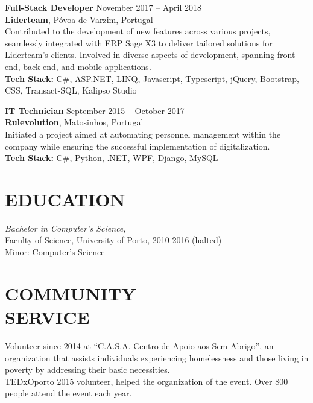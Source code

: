 \documentclass[margin, 10pt]{res} %
\newcommand{\jobheader}[4]{%
    \textbf{#1} \hfill #4\\
    \textbf{#2}, #3%
}
\newcommand{\jobentry}[6]{%
    \jobheader{#1}{#2}{#3}{#4}\\
    #5\\
    \textbf{Tech Stack:} #6
}
\begin{document}
\begin{resume}
    \jobentry{Full-Stack Developer}{Liderteam}{Póvoa de Varzim, Portugal}{November 2017 -- April 2018}{%
Contributed to the development of new features across various projects, seamlessly integrated with ERP Sage X3 to deliver tailored solutions for Liderteam's clients. Involved in diverse aspects of development, spanning front-end, back-end, and mobile applications.%
}{C\#, ASP.NET, LINQ, Javascript, Typescript, jQuery, Bootstrap, CSS, Transact-SQL, Kalipso Studio}


    \jobentry{IT Technician}{Rulevolution}{Matosinhos, Portugal}{September 2015 -- October 2017}{%
Initiated a project aimed at automating personnel management within the company while ensuring the successful implementation of digitalization.%
}{C\#, Python, .NET, WPF, Django, MySQL} %



    \section{EDUCATION}

     {\sl Bachelor in Computer's Science,} \\
    Faculty of Science, University of Porto, 2010-2016 (halted)  \\
    Minor: Computer's Science


    \section{COMMUNITY \\ SERVICE}

    Volunteer since 2014 at ``C.A.S.A.-Centro de Apoio aos Sem Abrigo'', an organization that assists individuals experiencing homelessness and those living in poverty by addressing their basic necessities.\\
    TEDxOporto 2015 volunteer, helped the organization of the event. Over 800 people attend the event each year.


\end{resume}
\end{document}
